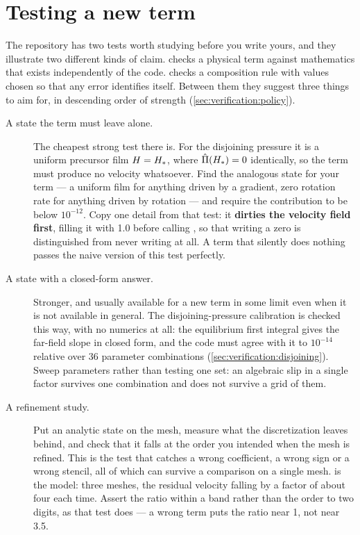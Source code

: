 \section{Testing a new term}
\label{sec:extending:testing}

The repository has two tests worth studying before you write yours, and they
illustrate two different kinds of claim.
 checks a physical term against
mathematics that exists independently of the code.
 checks a composition rule with
values chosen so that any error identifies itself. Between them they suggest
three things to aim for, in descending order of strength
(\cref{sec:verification:policy}).

\begin{description}

  \item[A state the term must leave alone.] The cheapest strong test there is.
    For the disjoining pressure it is a uniform precursor film $H = H_{*}$,
    where $\hat{\Pi}(H_{*}) = 0$ identically, so the term must produce no
    velocity whatsoever. Find the analogous state for your term --- a uniform
    film for anything driven by a gradient, zero rotation rate for anything
    driven by rotation --- and require the contribution to be below
    $10^{-12}$. Copy one detail from that test: it \textbf{dirties the velocity
    field first}, filling it with 1.0 before calling , so
    that writing a zero is distinguished from never writing at all. A term that
    silently does nothing passes the naive version of this test perfectly.

  \item[A state with a closed-form answer.] Stronger, and usually available for
    a new term in some limit even when it is not available in general. The
    disjoining-pressure calibration is checked this way, with no numerics at
    all: the equilibrium first integral gives the far-field slope in closed
    form, and the code must agree with it to $10^{-14}$ relative over 36
    parameter combinations (\cref{sec:verification:disjoining}). Sweep
    parameters rather than testing one set: an algebraic slip in a single
    factor survives one combination and does not survive a grid of them.

  \item[A refinement study.] Put an analytic state on the mesh, measure what
    the discretization leaves behind, and check that it falls at the order you
    intended when the mesh is refined. This is the test that catches a wrong
    coefficient, a wrong sign or a wrong stencil, all of which can survive a
    comparison on a single mesh.  is the model: three
    meshes, the residual velocity falling by a factor of about four each time.
    Assert the ratio within a band rather than the order to two digits, as that
    test does --- a wrong term puts the ratio near 1, not near 3.5.

\end{description}

